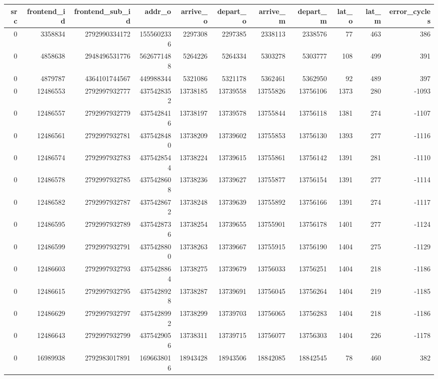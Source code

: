 \begin{tabular}{rrrrrrrrrrr}
\toprule
src & frontend\_id & frontend\_sub\_id & addr\_o & arrive\_o & depart\_o & arrive\_m & depart\_m & lat\_o & lat\_m & error\_cycles \\
\midrule
0 & 3358834 & 2792990334172 & 1555602336 & 2297308 & 2297385 & 2338113 & 2338576 & 77 & 463 & 386 \\
0 & 4858638 & 2948496531776 & 5626771488 & 5264226 & 5264334 & 5303278 & 5303777 & 108 & 499 & 391 \\
0 & 4879787 & 4364101744567 & 449988344 & 5321086 & 5321178 & 5362461 & 5362950 & 92 & 489 & 397 \\
0 & 12486553 & 2792997932777 & 4375428352 & 13738185 & 13739558 & 13755826 & 13756106 & 1373 & 280 & -1093 \\
0 & 12486557 & 2792997932779 & 4375428416 & 13738197 & 13739578 & 13755844 & 13756118 & 1381 & 274 & -1107 \\
0 & 12486561 & 2792997932781 & 4375428480 & 13738209 & 13739602 & 13755853 & 13756130 & 1393 & 277 & -1116 \\
0 & 12486574 & 2792997932783 & 4375428544 & 13738224 & 13739615 & 13755861 & 13756142 & 1391 & 281 & -1110 \\
0 & 12486578 & 2792997932785 & 4375428608 & 13738236 & 13739627 & 13755877 & 13756154 & 1391 & 277 & -1114 \\
0 & 12486582 & 2792997932787 & 4375428672 & 13738248 & 13739639 & 13755892 & 13756166 & 1391 & 274 & -1117 \\
0 & 12486595 & 2792997932789 & 4375428736 & 13738254 & 13739655 & 13755901 & 13756178 & 1401 & 277 & -1124 \\
0 & 12486599 & 2792997932791 & 4375428800 & 13738263 & 13739667 & 13755915 & 13756190 & 1404 & 275 & -1129 \\
0 & 12486603 & 2792997932793 & 4375428864 & 13738275 & 13739679 & 13756033 & 13756251 & 1404 & 218 & -1186 \\
0 & 12486615 & 2792997932795 & 4375428928 & 13738287 & 13739691 & 13756045 & 13756264 & 1404 & 219 & -1185 \\
0 & 12486629 & 2792997932797 & 4375428992 & 13738299 & 13739703 & 13756065 & 13756283 & 1404 & 218 & -1186 \\
0 & 12486643 & 2792997932799 & 4375429056 & 13738311 & 13739715 & 13756077 & 13756303 & 1404 & 226 & -1178 \\
0 & 16989938 & 2792983017891 & 1696638016 & 18943428 & 18943506 & 18842085 & 18842545 & 78 & 460 & 382 \\

\end{tabular}
